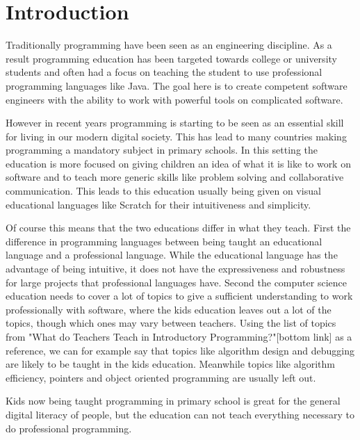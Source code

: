 \chapter{Introduction}
\label{chap:introduction}
Traditionally programming have been seen as an engineering discipline.
As a result programming education has been targeted towards college or university students and often had a focus on teaching the student to use professional programming languages like Java.
The goal here is to create competent software engineers with the ability to work with powerful tools on complicated software.

However in recent years programming is starting to be seen as an essential skill for living in our modern digital society.
This has lead to many countries making programming a mandatory subject in primary schools.
In this setting the education is more focused on giving children an idea of what it is like to work on software and to teach more generic skills like problem solving and collaborative communication. This leads to this education usually being given on visual educational languages like Scratch for their intuitiveness and simplicity.

Of course this means that the two educations differ in what they teach.
First the difference in programming languages between being taught an educational language and a professional language. While the educational language has the advantage of being intuitive, it does not have the expressiveness and robustness for large projects that professional languages have.
Second the computer science education needs to cover a lot of topics to give a sufficient understanding to work professionally with software, where the kids education leaves out a lot of the topics, though which ones may vary between teachers.
Using the list of topics from "What do Teachers Teach in Introductory Programming?"[bottom link] as a reference, we can for example say that topics like algorithm design and debugging are likely to be taught in the kids education. Meanwhile topics like algorithm efficiency, pointers and object oriented programming are usually left out.

Kids now being taught programming in primary school is great for the general digital literacy of people, but the education can not teach everything necessary to do professional programming.

